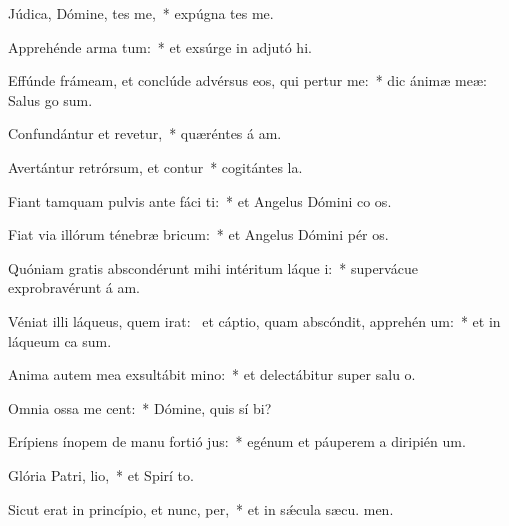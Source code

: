 \item Júdica, Dómine, tes me,~* expúgna tes me.
\item Apprehénde arma  tum:~* et exsúrge in adjutó hi.
\item Effúnde frámeam, et conclúde advérsus eos, qui pertur me:~* dic ánimæ meæ: Salus  go sum.
\item Confundántur et revetur,~* quæréntes á am.
\item Avertántur retrórsum, et contur~* cogitántes  la.
\item Fiant tamquam pulvis ante fáci ti:~* et Angelus Dómini co os.
\item Fiat via illórum ténebræ  bricum:~* et Angelus Dómini pér os.
\item Quóniam gratis abscondérunt mihi intéritum láque i:~* supervácue exprobravérunt á am.
\item Véniat illi láqueus, quem irat:~\pscross{} et cáptio, quam abscóndit, apprehén um:~* et in láqueum ca  sum.
\item Anima autem mea exsultábit  mino:~* et delectábitur super salu o.
\item Omnia ossa me cent:~* Dómine, quis sí bi?
\item Erípiens ínopem de manu fortió jus:~* egénum et páuperem a diripién um.
\item Glória Patri,  lio,~* et Spirí to.
\item Sicut erat in princípio, et nunc,  per,~* et in sǽcula sæcu. men.
